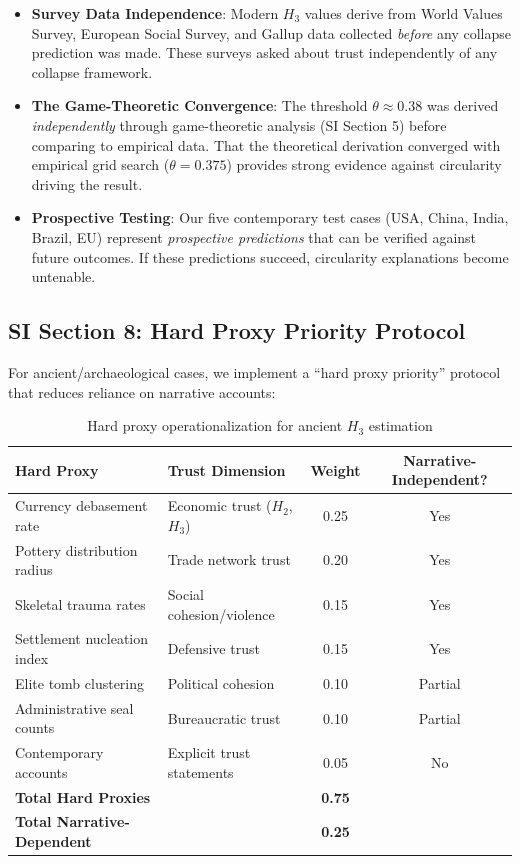 \documentclass[11pt,a4paper]{article}
\newcommand{\Hthree}{H_3}
\begin{document}
\begin{itemize}
\item \textbf{Survey Data Independence}: Modern $\Hthree$ values derive from World Values Survey, European Social Survey, and Gallup data collected \textit{before} any collapse prediction was made. These surveys asked about trust independently of any collapse framework.

\item \textbf{The Game-Theoretic Convergence}: The threshold $\theta \approx 0.38$ was derived \textit{independently} through game-theoretic analysis (SI Section 5) before comparing to empirical data. That the theoretical derivation converged with empirical grid search ($\theta = 0.375$) provides strong evidence against circularity driving the result.

\item \textbf{Prospective Testing}: Our five contemporary test cases (USA, China, India, Brazil, EU) represent \textit{prospective predictions} that can be verified against future outcomes. If these predictions succeed, circularity explanations become untenable.
\end{itemize}

\subsection{SI Section 8: Hard Proxy Priority Protocol}

For ancient/archaeological cases, we implement a ``hard proxy priority'' protocol that reduces reliance on narrative accounts:

\begin{table}[H]
\centering
\caption{Hard proxy operationalization for ancient $\Hthree$ estimation}
\begin{tabular}{llcc}
\toprule
\textbf{Hard Proxy} & \textbf{Trust Dimension} & \textbf{Weight} & \textbf{Narrative-Independent?} \\
\midrule
Currency debasement rate & Economic trust ($H_2$, $\Hthree$) & 0.25 & Yes \\
Pottery distribution radius & Trade network trust & 0.20 & Yes \\
Skeletal trauma rates & Social cohesion/violence & 0.15 & Yes \\
Settlement nucleation index & Defensive trust & 0.15 & Yes \\
Elite tomb clustering & Political cohesion & 0.10 & Partial \\
Administrative seal counts & Bureaucratic trust & 0.10 & Partial \\
Contemporary accounts & Explicit trust statements & 0.05 & No \\
\midrule
\textbf{Total Hard Proxies} & & \textbf{0.75} & \\
\textbf{Total Narrative-Dependent} & & \textbf{0.25} & \\
\bottomrule
\end{tabular}
\end{table}
\end{document}
